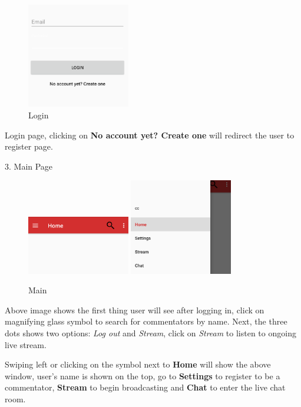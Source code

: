 \documentclass{article}
\begin{document}
\begin{flushleft}
\begin{figure}[H]
	\centering
	\includegraphics[width=0.40\textwidth]{login}
	\caption{Login}
	\label{fig:login}
\end{figure}
Login page, clicking on \textbf{No account yet? Create one} will redirect the user to register page.\par
{\large 3. Main Page}\par
\begin{figure}[H]
	\includegraphics[width=0.40\textwidth]{main}
	\hfill
	\includegraphics[width=0.40\textwidth]{main2}
	\caption{Main}
	\label{fig:main}
\end{figure}
Above image shows the first thing user will see after logging in, click on magnifying glass symbol to search for commentators by name. Next, the three dots shows two options: \textit{Log out} and \textit{Stream}, click on \textit{Stream} to listen to ongoing live stream.\par
Swiping left or clicking on the symbol next to \textbf{Home} will show the above window, user's name is shown on the top, go to \textbf{Settings} to register to be a commentator, \textbf{Stream} to begin broadcasting and \textbf{Chat} to enter the live chat room.\par

\end{flushleft}
\end{document}
